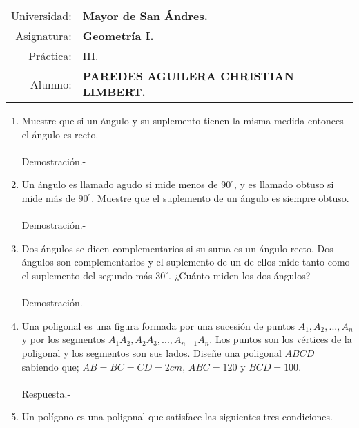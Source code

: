 \documentclass[10pt]{article}
\begin{document}
\begin{tabular}{r l }
Universidad: & \textbf{Mayor de San Ándres.}\\
Asignatura: & \textbf{Geometría I.}\\
 Práctica: & III.\\ 
Alumno: & \textbf{PAREDES AGUILERA CHRISTIAN LIMBERT.}
\end{tabular}
\begin{flushleft}
\end{flushleft}



    \begin{enumerate}

	\item Muestre que si un ángulo y su suplemento tienen la misma medida entonces el ángulo es recto.\\\\
	Demostración.-\;

	\item Un ángulo es llamado agudo si mide menos de $90^{\circ}$, y es llamado obtuso si mide más de $90^{\circ}$. Muestre que el suplemento de un ángulo es siempre obtuso.\\\\
	Demostración.-\;

	\item Dos ángulos se dicen complementarios si su suma es un ángulo recto. Dos ángulos son complementarios y el suplemento de un de ellos mide tanto como el suplemento del segundo más $30^{\circ}$. ¿Cuánto miden los dos ángulos?\\\\
	Demostración.-\;

	\item Una poligonal es una figura formada por una sucesión de puntos $A_1,A_2,...,A_n$ y por los segmentos $A_1A_2,A_2A_3,...,A_{n-1}A_n$. Los puntos son los vértices de la poligonal y los segmentos son sus lados. Diseñe una poligonal $ABCD$ sabiendo que; $AB=BC=CD=2cm$, $ABC=120$ y $BCD=100$.\\\\
	Respuesta.-\;

	\item Un polígono es una poligonal que satisface las siguientes tres condiciones.
	    \begin{enumerate}[\bfseries a)]


\end{enumerate}
\end{enumerate}
\end{document}
